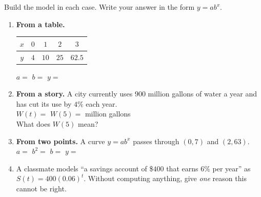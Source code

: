 \documentclass[10pt]{article}
\begin{document}
\begin{practicebox}
Build the model in each case. Write your answer in the form $y=ab^{x}$.
\begin{enumerate}[leftmargin=1.7em, itemsep=6pt]
  \item \textbf{From a table.}
    \begin{center}
    \renewcommand{\arraystretch}{1.25}
    \begin{tabular}{|c|c|c|c|c|}
    \hline
    $x$ & $0$ & $1$ & $2$ & $3$ \\ \hline
    $y$ & $4$ & $10$ & $25$ & $62.5$ \\ \hline
    \end{tabular}
    \end{center}
    $a=$  \quad $b=$  \quad $y=$ 

  \item \textbf{From a story.} A city currently uses $900$ million gallons of water a year and has
        cut its use by $4\%$ each year. \\[3pt]
        $W(t)=$  \quad $W(5)=$  million gallons \\[3pt]
        What does $W(5)$ mean? 

  \item \textbf{From two points.} A curve $y=ab^{x}$ passes through $(0,7)$ and $(2,63)$. \\[3pt]
        $a=$  \quad $b^{2}=$  \quad $b=$  \quad
        $y=$ 

  \item A classmate models ``a savings account of \$$400$ that earns $6\%$ per year'' as
        $S(t)=400(0.06)^{t}$. Without computing anything, give \emph{one} reason this cannot be
        right. 
\end{enumerate}
\end{practicebox}
\end{document}
